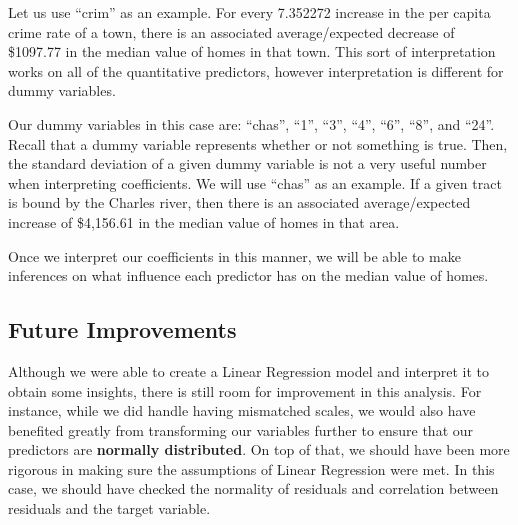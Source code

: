 \documentclass[11pt]{article}
\begin{document}
    Let us use ``crim'' as an example. For every 7.352272 increase in the
per capita crime rate of a town, there is an associated average/expected
decrease of \$1097.77 in the median value of homes in that town. This
sort of interpretation works on all of the quantitative predictors,
however interpretation is different for dummy variables.

Our dummy variables in this case are: ``chas'', ``1'', ``3'', ``4'',
``6'', ``8'', and ``24''. Recall that a dummy variable represents
whether or not something is true. Then, the standard deviation of a
given dummy variable is not a very useful number when interpreting
coefficients. We will use ``chas'' as an example. If a given tract is
bound by the Charles river, then there is an associated average/expected
increase of \$4,156.61 in the median value of homes in that area.

Once we interpret our coefficients in this manner, we will be able to
make inferences on what influence each predictor has on the median value
of homes.

    \hypertarget{future-improvements}{%
\subsection{Future Improvements}\label{future-improvements}}

Although we were able to create a Linear Regression model and interpret
it to obtain some insights, there is still room for improvement in this
analysis. For instance, while we did handle having mismatched scales, we
would also have benefited greatly from transforming our variables
further to ensure that our predictors are \textbf{normally distributed}.
On top of that, we should have been more rigorous in making sure the
assumptions of Linear Regression were met. In this case, we should have
checked the normality of residuals and correlation between residuals and
the target variable.


    
    
    
    
\end{document}
